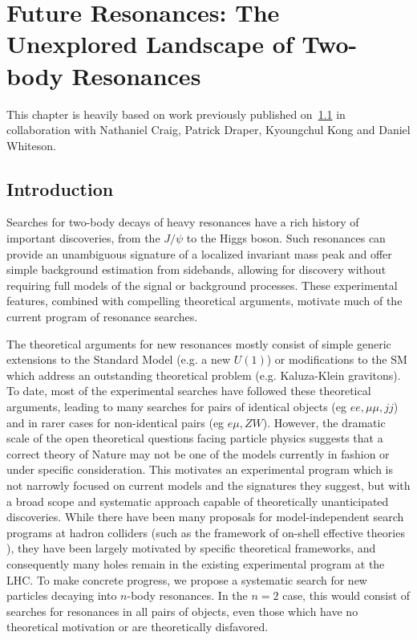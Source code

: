 
\chapter{Future Resonances: The Unexplored Landscape of Two-body Resonances}

This chapter is heavily based on work previously published on~\ref{} in collaboration with Nathaniel Craig, Patrick Draper, Kyoungchul Kong and Daniel Whiteson.


\newcommand{\none}{\emptyset}
\newcommand{\bnum}[2]{(\mathbf{#1}, #2)}
\newcommand{\fnum}[2]{[\mathbf{#1}, #2]}

\section{Introduction}

Searches for two-body decays of heavy resonances have a rich history of important discoveries, from the $J/\psi$ to the Higgs boson.  Such resonances can provide an unambiguous signature of a localized invariant mass peak and offer simple background estimation from sidebands, allowing for discovery without requiring full models of the signal or background processes.  These experimental features, combined with compelling theoretical arguments, motivate much of the current program of resonance searches.

The theoretical arguments for new resonances mostly consist of simple generic extensions to the Standard Model (e.g. a new $U(1)$) or modifications to the SM which address an outstanding theoretical problem (e.g. Kaluza-Klein gravitons).  To date, most of the experimental searches have followed these theoretical arguments, leading to many searches for pairs of identical objects (eg $ee,\mu\mu, jj$) and in rarer cases for non-identical pairs (eg $e\mu,ZW$).   However,  the dramatic scale of the open theoretical  questions facing particle physics suggests that a correct theory of Nature may not be one of the models currently in fashion or under specific consideration.   This motivates an experimental program which is not narrowly focused on current models and the signatures they suggest, but with a broad scope and systematic approach capable of theoretically unanticipated discoveries. While there have been many proposals for model-independent search programs at hadron colliders (such as the framework of on-shell effective theories \cite{ArkaniHamed:2007fw}), they have been largely motivated by specific theoretical frameworks, and consequently many holes remain in the existing experimental program at the LHC. To make concrete progress, we propose a systematic search for new particles decaying into $n$-body resonances. In the $n=2$ case, this would consist of searches for resonances in all pairs of objects, even those which have no theoretical motivation or are theoretically disfavored.

